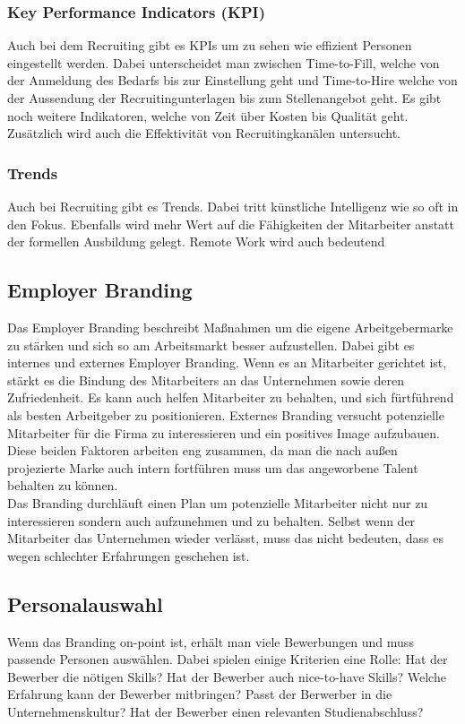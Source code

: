 \documentclass{article}
\begin{document}
	 \subsubsection{Key Performance Indicators (KPI)}
	 Auch bei dem Recruiting gibt es KPIs um zu sehen wie effizient Personen eingestellt werden. Dabei unterscheidet man zwischen Time-to-Fill, welche von der Anmeldung des Bedarfs bis zur Einstellung geht und Time-to-Hire welche von der Aussendung der Recruitingunterlagen bis zum Stellenangebot geht. Es gibt noch weitere Indikatoren, welche von Zeit über Kosten bis Qualität geht. Zusätzlich wird auch die Effektivität von Recruitingkanälen untersucht. \\
	 \subsubsection{Trends}
	 Auch bei Recruiting gibt es Trends. Dabei tritt künstliche Intelligenz wie so oft in den Fokus. Ebenfalls wird mehr Wert auf die Fähigkeiten der Mitarbeiter anstatt der formellen Ausbildung gelegt. Remote Work wird auch bedeutend
	 \subsection{Employer Branding}
	 Das Employer Branding beschreibt Maßnahmen um die eigene Arbeitgebermarke zu stärken und sich so am Arbeitsmarkt besser aufzustellen. Dabei gibt es internes und externes Employer Branding. Wenn es an Mitarbeiter gerichtet ist, stärkt es die Bindung des Mitarbeiters an das Unternehmen sowie deren Zufriedenheit. Es kann auch helfen Mitarbeiter zu behalten, und sich fürtführend als besten Arbeitgeber zu positionieren. Externes Branding versucht potenzielle Mitarbeiter für die Firma zu interessieren und ein positives Image aufzubauen. Diese beiden Faktoren arbeiten eng zusammen, da man die nach außen projezierte Marke auch intern fortführen muss um das angeworbene Talent behalten zu können. \\
	 Das Branding durchläuft einen Plan um potenzielle Mitarbeiter nicht nur zu interessieren sondern auch aufzunehmen und zu behalten. Selbst wenn der Mitarbeiter das Unternehmen wieder verlässt, muss das nicht bedeuten, dass es wegen schlechter Erfahrungen geschehen ist.
	 \subsection{Personalauswahl}
	 Wenn das Branding on-point ist, erhält man viele Bewerbungen und muss passende Personen auswählen. Dabei spielen einige Kriterien eine Rolle: Hat der Bewerber die nötigen Skills? Hat der Bewerber auch nice-to-have Skills? Welche Erfahrung kann der Bewerber mitbringen? Passt der Berwerber in die Unternehmenskultur? Hat der Bewerber einen relevanten Studienabschluss?
\end{document}
